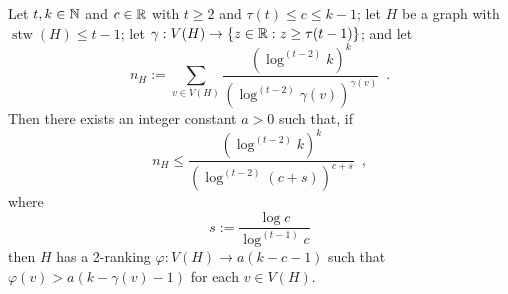 \documentclass[kpfonts]{patmorin}
\DeclareMathOperator{\stw}{stw}
\theoremstyle{named}
\begin{document}
\begin{lem}\label{t-tree-slack}
Let $t,k\in\mathbb{N}$ and $c\in\mathbb{R}$ with $t\ge 2$ and $\tau(t)\le c\le k-1$; let $H$ be a graph with $\stw(H)\le t-1$;
let $\gamma:V(H)\to\{z\in\mathbb{R}: z\ge \tau(t-1)\}$; and let
\[
    n_H:=\sum_{v\in V(H)} \frac{\left(\log^{(t-2)} k\right)^k}{\left(\log^{(t-2)} \gamma(v)\right)^{\gamma(v)}} \enspace .
\]
Then there exists an integer constant $a>0$ such that,
if
\begin{equation}
     n_H \le \frac{(\log^{(t-2)} k)^k}{\left(\log^{(t-2)} (c + s)\right)^{c+s}} \enspace ,
 \label{total-weight-i}
\end{equation}
where
\[
    s := \frac{\log c}{\log^{(t-1)} c}
\]
then $H$ has a 2-ranking $\varphi:V(H)\to a(k-c-1)$ such that $\varphi(v)> a(k-\gamma(v)-1)$ for each $v\in V(H)$.
\end{lem}
\end{document}
